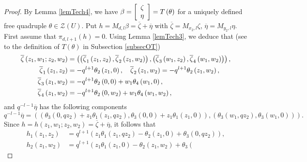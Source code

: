 \documentclass[12pt,reqno]{amsart}%
\theoremstyle{plain}
\numberwithin{theorem}{section} \numberwithin{equation}{section}
\numberwithin{lemma}{section}
\numberwithin{remark}{section}
\numberwithin{example}{section}
\numberwithin{proposition}{section}
\numberwithin{definition}{section}
\numberwithin{corollary}{section}
\begin{document}
\begin{proof}
By Lemma \ref{lemTech4}, we have $\beta=\left[
\begin{array}
[c]{c}%
\zeta\\
\eta
\end{array}
\right]  =T\left(  \theta\right)  $ for a uniquely defined free quadruple
$\theta\in\mathcal{Z}\left(  U\right)  $. Put $h=M_{d,l}\beta=\overline{\zeta
}+\overline{\eta}$ with $\overline{\zeta}=M_{x_{2},l}\zeta$, $\overline{\eta
}=M_{y_{2},l}\eta$. First assume that $\pi_{d,l+1}\left(  h\right)  =0$. Using
Lemma \ref{lemTech3}, we deduce that (see to the definition of $T\left(
\theta\right)  $ in Subsection \ref{subsecOT})%
\begin{align*}
\overline{\zeta}\left(  z_{1},w_{1};z_{2},w_{2}\right)   &  =\left(  \left(
\overline{\zeta}_{1}\left(  z_{1},z_{2}\right)  ,\overline{\zeta}_{2}\left(
z_{1},w_{2}\right)  \right)  ,\left(  \overline{\zeta}_{3}\left(  w_{1}%
,z_{2}\right)  ,\overline{\zeta}_{4}\left(  w_{1},w_{2}\right)  \right)
\right)  ,\\
\overline{\zeta}_{1}\left(  z_{1},z_{2}\right)   &  =-q^{l+1}\theta_{2}\left(
z_{1},0\right)  ,\text{\quad}\overline{\zeta}_{2}\left(  z_{1},w_{2}\right)
=-q^{l+1}\theta_{2}\left(  z_{1},w_{2}\right)  ,\\
\overline{\zeta}_{3}\left(  z_{1},w_{2}\right)   &  =-q^{l+1}\theta_{2}\left(
0,0\right)  +w_{1}\theta_{4}\left(  w_{1},0\right)  ,\\
\overline{\zeta}_{4}\left(  z_{1},w_{2}\right)   &  =-q^{l+1}\theta_{2}\left(
0,w_{2}\right)  +w_{1}\theta_{4}\left(  w_{1},w_{2}\right)  ,
\end{align*}
and $q^{-l-1}\overline{\eta}$ has the following components
\[
q^{-l-1}\overline{\eta}=\left(  \left(  \theta_{3}\left(  0,qz_{2}\right)
+z_{1}\theta_{1}\left(  z_{1},qz_{2}\right)  ,\theta_{3}\left(  0,0\right)
+z_{1}\theta_{1}\left(  z_{1},0\right)  \right)  ,\left(  \theta_{3}\left(
w_{1},qz_{2}\right)  ,\theta_{3}\left(  w_{1},0\right)  \right)  \right)  .
\]
Since $h=h\left(  z_{1},w_{1};z_{2},w_{2}\right)  =\overline{\zeta}%
+\overline{\eta}$, it follows that%
\begin{align*}
h_{1}\left(  z_{1},z_{2}\right)   &  =q^{l+1}\left(  z_{1}\theta_{1}\left(
z_{1},qz_{2}\right)  -\theta_{2}\left(  z_{1},0\right)  +\theta_{3}\left(
0,qz_{2}\right)  \right)  ,\\
h_{2}\left(  z_{1},w_{2}\right)   &  =q^{l+1}\left(  z_{1}\theta_{1}\left(
z_{1},0\right)  -\theta_{2}\left(  z_{1},w_{2}\right)  +\theta_{3}\left(

\end{align*}
\end{proof}
\end{document}
